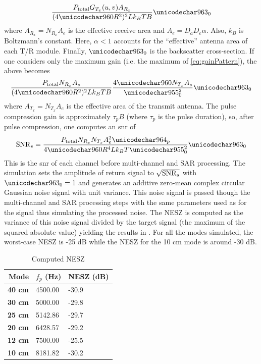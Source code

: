 \begin{equation}
 \frac{P_{\text{total}}G_{T_x}(u,v)A_{R_x}}{(4\pi R^2)^2Lk_BTB}\crossSection
\end{equation}
where $A_{R_x}=N_{R_x}A_e$ is the effective receive area and $A_e=D_aD_e\alpha$. Also, $k_B$ is Boltzmann's constant. Here, $\alpha<1$ accounts for the ``effective'' antenna area of each T/R module. Finally, $\crossSection$ is the backscatter cross-section. If one considers only the maximum gain (i.e. the maximum of \eqref{eq:gainPattern}), the above becomes
\begin{equation}
 \frac{P_{\text{total}}N_{R_x}A_e}{(4\pi R^2)^2Lk_BTB}\frac{4\pi N_{T_x}A_e}{\lambda_0^2}\crossSection
\end{equation}
where $A_{T_x}=N_{T_x}A_e$ is the effective area of the transmit antenna. The pulse compression gain is approximately $\tau_pB$ (where $\tau_p$ is the pulse duration), so, after pulse compression, one computes an \gls{snr} of
\begin{equation}
 \SNR_s = \frac{P_{\text{total}}N_{R_x}N_{T_x}A_e^2\tau_p}{4\pi R^4 Lk_BT\lambda_0^2}\crossSection
 \label{eq:pulseCompBeamFormedSNR}
\end{equation}
This is the \gls{snr} of each channel before multi-channel and SAR processing. The simulation sets the amplitude of return signal to $\sqrt{\text{SNR}_s}$ with $\crossSection=1$ and generates an additive zero-mean complex circular Gaussian noise signal with unit variance. This noise signal is passed though the multi-channel and SAR processing steps with the same parameters used as for the signal thus simulating the processed noise. The NESZ is computed as the variance of this noise signal divided by the target signal (the maximum of the squared absolute value) yielding the results in . For all the modes simulated, the worst-case NESZ is -25 dB while the NESZ for the 10 cm mode is around -30 dB.
\begin{table}[ht!]
\begin{center}
 \caption{Computed NESZ}
 \label{tb:nesz}
 \begin{tabular}{r|l|l}
 {\bf Mode} & {\bf $f_p$} (Hz)& {\bf NESZ} (dB)\\\hline
 {\bf 40 cm} & 4500.00 & -30.9\\\hline
 {\bf 30 cm} & 5000.00 & -29.8\\\hline
 {\bf 25 cm} & 5142.86 & -29.7\\\hline
 {\bf 20 cm} & 6428.57 & -29.2\\\hline
 {\bf 12 cm} & 7500.00 & -25.5\\\hline
 {\bf 10 cm} & 8181.82 & -30.2\\\hline
 \end{tabular}
 \end{center}
\end{table}
